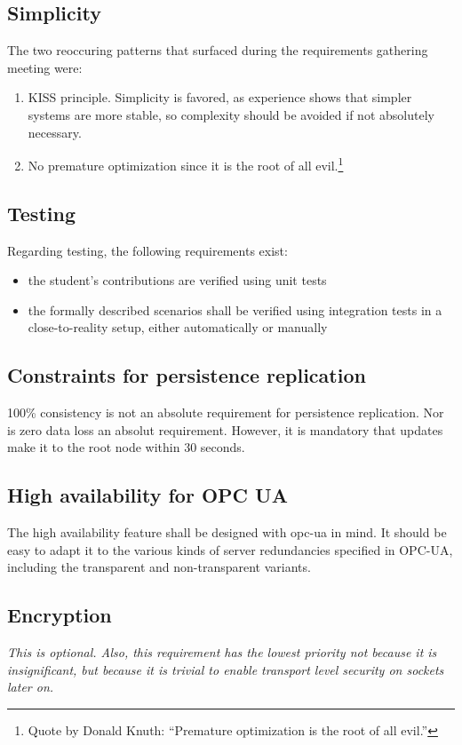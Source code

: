 \subsection{Simplicity}
The two reoccuring patterns that surfaced during the requirements gathering
meeting were:

\begin{enumerate}
\item \gls{KISS} principle. Simplicity is favored, as experience shows that
	simpler systems are more stable, so complexity should be avoided if not
	absolutely necessary.

\item No premature optimization since it is the root of all evil.\footnote{Quote
	by Donald Knuth: ``Premature optimization is the root of all evil.''}
\end{enumerate}


\subsection{Testing}
Regarding testing, the following requirements exist:
\begin{itemize}
	\item the student's contributions are verified using unit tests
	\item the formally described scenarios shall be verified using
		integration tests in a close-to-reality setup, either
		automatically or manually
\end{itemize}

\subsection{Constraints for persistence replication}
100\% consistency is not an absolute requirement for persistence replication.
Nor is zero data loss an absolut requirement. However, it is mandatory that
updates make it to the root node within 30 seconds.

\subsection{High availability for OPC UA}
The high availability feature shall be designed with \gls{opc-ua} in mind. It
should be easy to adapt it to the various kinds of server redundancies specified
in OPC-UA, including the transparent and non-transparent variants.

\subsection{Encryption}
\emph{This is optional. Also, this requirement has the lowest priority not
because it is insignificant, but because it is trivial to enable transport level
security on \zmq sockets later on.}

